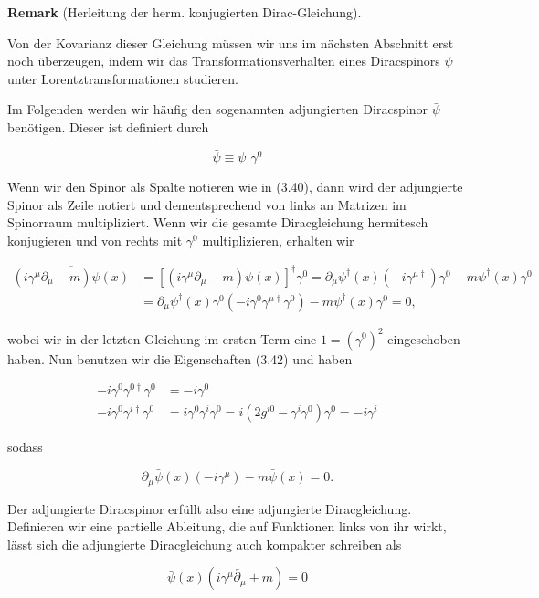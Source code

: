 \documentclass[10pt, letterpaper]{article}
\newcommand{\CustomHeading}[3]{%
  \par\medskip\noindent%
  \textbf{#1 #2} \textnormal{(#3)}.\enskip%
}
\newenvironment{REM}[2]{\begin{unitbox}\CustomHeading{Remark}{#1}{#2}}{\end{unitbox}}
\begin{document}
\begin{REM}{}{Herleitung der herm. konjugierten Dirac-Gleichung}

Von der Kovarianz dieser Gleichung müssen wir uns im nächsten Abschnitt erst noch überzeugen, indem wir das Transformationsverhalten eines Diracspinors $\psi$ unter Lorentztransformationen studieren.

Im Folgenden werden wir häufig den sogenannten adjungierten Diracspinor $\bar{\psi}$ benötigen. Dieser ist definiert durch

$$
\bar{\psi} \equiv \psi^{\dagger} \gamma^{0}
$$

Wenn wir den Spinor als Spalte notieren wie in (3.40), dann wird der adjungierte Spinor als Zeile notiert und dementsprechend von links an Matrizen im Spinorraum multipliziert. Wenn wir die gesamte Diracgleichung hermitesch konjugieren und von rechts mit $\gamma^{0}$ multiplizieren, erhalten wir

$$
\begin{aligned}
\overline{\left(i \gamma^{\mu} \partial_{\mu}-m\right) \psi(x)} & =\left[\left(i \gamma^{\mu} \partial_{\mu}-m\right) \psi(x)\right]^{\dagger} \gamma^{0}=\partial_{\mu} \psi^{\dagger}(x)\left(-i \gamma^{\mu \dagger}\right) \gamma^{0}-m \psi^{\dagger}(x) \gamma^{0} \\
& =\partial_{\mu} \psi^{\dagger}(x) \gamma^{0}\left(-i \gamma^{0} \gamma^{\mu \dagger} \gamma^{0}\right)-m \psi^{\dagger}(x) \gamma^{0}=0,
\end{aligned}
$$

wobei wir in der letzten Gleichung im ersten Term eine $1=\left(\gamma^{0}\right)^{2}$ eingeschoben haben. Nun benutzen wir die Eigenschaften (3.42) und haben

$$
\begin{aligned}
-i \gamma^{0} \gamma^{0 \dagger} \gamma^{0} & =-i \gamma^{0} \\
-i \gamma^{0} \gamma^{i \dagger} \gamma^{0} & =i \gamma^{0} \gamma^{i} \gamma^{0}=i\left(2 g^{i 0}-\gamma^{i} \gamma^{0}\right) \gamma^{0}=-i \gamma^{i}
\end{aligned}
$$

sodass

$$
\partial_{\mu} \bar{\psi}(x)\left(-i \gamma^{\mu}\right)-m \bar{\psi}(x)=0 .
$$

Der adjungierte Diracspinor erfüllt also eine adjungierte Diracgleichung. Definieren wir eine partielle Ableitung, die auf Funktionen links von ihr wirkt, lässt sich die adjungierte Diracgleichung auch kompakter schreiben als

$$
\bar{\psi}(x)\left(i \gamma^{\mu} \overleftarrow{\partial_{\mu}}+m\right)=0
$$

\end{REM}
\end{document}
